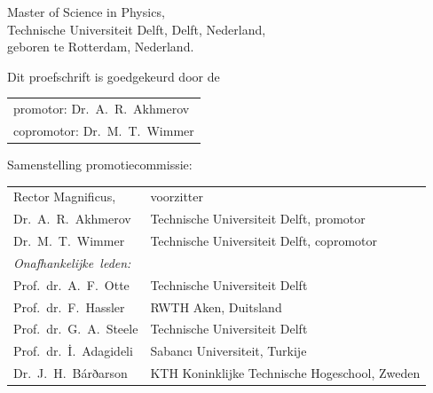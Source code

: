 \begin{titlepage}
\begin{center}
\bigskip
\bigskip

Master of Science in Physics, \\
Technische Universiteit Delft, Delft, Nederland, \\
geboren te Rotterdam, Nederland.

\vspace*{2\bigskipamount}

\end{center}

\clearpage
\thispagestyle{empty}

\noindent Dit proefschrift is goedgekeurd door de

\medskip\noindent
\begin{tabular}{l}
    promotor:  Dr.\ A.\ R.\ Akhmerov \\
    copromotor: Dr.\ M.\ T.\ Wimmer
\end{tabular}

\bigskip
\noindent Samenstelling promotiecommissie:

\medskip\noindent
\begin{tabular}{p{4cm}l}
    Rector Magnificus, & voorzitter \\
    Dr.\ A.\ R.\ Akhmerov & Technische Universiteit Delft, promotor \\
    Dr.\ M.\ T.\ Wimmer & Technische Universiteit Delft, copromotor \\

    \medskip
    \mbox{\emph{Onafhankelijke leden:}} & \\
    Prof.\ dr.\ A.\ F.\ Otte & Technische Universiteit Delft \\
    Prof.\ dr.\ F.\ Hassler & RWTH Aken, Duitsland \\
    Prof.\ dr.\ G.\ A.\ Steele & Technische Universiteit Delft \\
    Prof.\ dr.\ İ.\ Adagideli & Sabancı Universiteit, Turkije \\
    Dr.\ J.\ H.\ Bárðarson & KTH Koninklijke Technische Hogeschool, Zweden
    


\end{tabular}



\end{titlepage}
